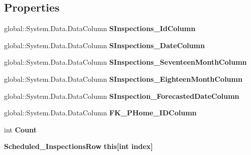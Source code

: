 \subsection*{Properties}
\begin{DoxyCompactItemize}
\item 
\mbox{\label{class_a_f_h___scheduler_1_1_home_inspection_data_set_1_1_scheduled___inspections_data_table_ab8b95f621ec14ebb46022116ba36158a}} 
global\+::\+System.\+Data.\+Data\+Column {\bfseries S\+Inspections\+\_\+\+Id\+Column}\hspace{0.3cm}{\ttfamily  [get]}
\item 
\mbox{\label{class_a_f_h___scheduler_1_1_home_inspection_data_set_1_1_scheduled___inspections_data_table_a1fe33c792f8346c71b27d17090ac2772}} 
global\+::\+System.\+Data.\+Data\+Column {\bfseries S\+Inspections\+\_\+\+Date\+Column}\hspace{0.3cm}{\ttfamily  [get]}
\item 
\mbox{\label{class_a_f_h___scheduler_1_1_home_inspection_data_set_1_1_scheduled___inspections_data_table_a64c4029e55b493e906414200ab0a419c}} 
global\+::\+System.\+Data.\+Data\+Column {\bfseries S\+Inspections\+\_\+\+Seventeen\+Month\+Column}\hspace{0.3cm}{\ttfamily  [get]}
\item 
\mbox{\label{class_a_f_h___scheduler_1_1_home_inspection_data_set_1_1_scheduled___inspections_data_table_a199b31f603d120824afb27316a8a9f72}} 
global\+::\+System.\+Data.\+Data\+Column {\bfseries S\+Inspections\+\_\+\+Eighteen\+Month\+Column}\hspace{0.3cm}{\ttfamily  [get]}
\item 
\mbox{\label{class_a_f_h___scheduler_1_1_home_inspection_data_set_1_1_scheduled___inspections_data_table_a134e7b2d760fc29f7819fc40be94e337}} 
global\+::\+System.\+Data.\+Data\+Column {\bfseries S\+Inspection\+\_\+\+Forecasted\+Date\+Column}\hspace{0.3cm}{\ttfamily  [get]}
\item 
\mbox{\label{class_a_f_h___scheduler_1_1_home_inspection_data_set_1_1_scheduled___inspections_data_table_a568446a692dfb4f156494727088a4718}} 
global\+::\+System.\+Data.\+Data\+Column {\bfseries F\+K\+\_\+\+P\+Home\+\_\+\+I\+D\+Column}\hspace{0.3cm}{\ttfamily  [get]}
\item 
\mbox{\label{class_a_f_h___scheduler_1_1_home_inspection_data_set_1_1_scheduled___inspections_data_table_aa037d603f047e8ad3b9d7aad5e04dfc1}} 
int {\bfseries Count}\hspace{0.3cm}{\ttfamily  [get]}
\item 
\mbox{\label{class_a_f_h___scheduler_1_1_home_inspection_data_set_1_1_scheduled___inspections_data_table_abf8cf775f4cc82f7459636b5139bcf8b}} 
\textbf{ Scheduled\+\_\+\+Inspections\+Row} {\bfseries this[int index]}\hspace{0.3cm}{\ttfamily  [get]}
\end{DoxyCompactItemize}
